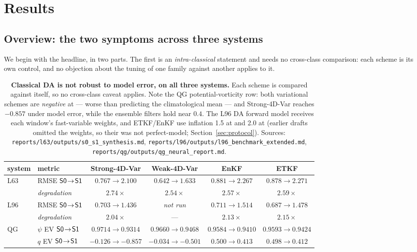 \section{Results}
\label{sec:results}

\subsection{Overview: the two symptoms across three systems}
\label{sec:overview}

We begin with the headline, in two parts. The first is an \emph{intra-classical}
statement and needs no cross-class comparison: each scheme is its own control,
and no objection about the tuning of one family against another applies to it.

\begin{table}[t]
\centering
\small
\begin{tabular}{@{}llcccc@{}}
\toprule
\textbf{system} & \textbf{metric} & \textbf{Strong-4D-Var} & \textbf{Weak-4D-Var} & \textbf{EnKF} & \textbf{ETKF} \\
\midrule
L63 & RMSE $\textsf{S0}\!\to\!\textsf{S1}$ & $0.767 \to 2.100$ & $0.642 \to 1.633$ & $0.881 \to 2.267$ & $0.878 \to 2.271$ \\
    & \emph{degradation}   & $2.74\times$ & $2.54\times$ & $2.57\times$ & $2.59\times$ \\
\addlinespace
L96 & RMSE $\textsf{S0}\!\to\!\textsf{S1}$ & $0.703 \to 1.436$ & \emph{not run} & $0.711 \to 1.514$ & $0.687 \to 1.478$ \\
    & \emph{degradation}   & $2.04\times$ & --- & $2.13\times$ & $\mathbf{2.15\times}$ \\
\addlinespace
QG  & $\psi$ EV $\textsf{S0}\!\to\!\textsf{S1}$ & $0.9714 \to 0.9314$ & $0.9660 \to 0.9468$ & $0.9584 \to 0.9410$ & $0.9593 \to 0.9424$ \\
    & $q$ EV $\textsf{S0}\!\to\!\textsf{S1}$ & $\mathbf{-0.126 \to -0.857}$ & $-0.034 \to -0.501$ & $0.500 \to 0.413$ & $0.498 \to 0.412$ \\
\bottomrule
\end{tabular}
\caption{\textbf{Classical DA is not robust to model error, on all three
systems.} Each scheme is compared against itself, so no cross-class caveat
applies. Note the QG potential-vorticity row: both variational schemes are
\emph{negative} at \Sz{} --- worse than predicting the climatological mean ---
and Strong-4D-Var reaches $-0.857$ under model error, while the ensemble filters
hold near $0.4$. The L96 DA forward model receives each window's fast-variable
weights, and ETKF/EnKF use inflation 1.5 at \Sz{} and 2.0 at \So{} (earlier drafts
omitted the weights, so their \Sz{} was not perfect-model; Section~\ref{sec:protocol}).
Sources: \texttt{reports/l63/outputs/s0\_s1\_synthesis.md},
\texttt{reports/l96/outputs/l96\_benchmark\_extended.md},
\texttt{reports/qg/outputs/qg\_neural\_report.md}.}
\label{tab:overview-robust}
\end{table}


